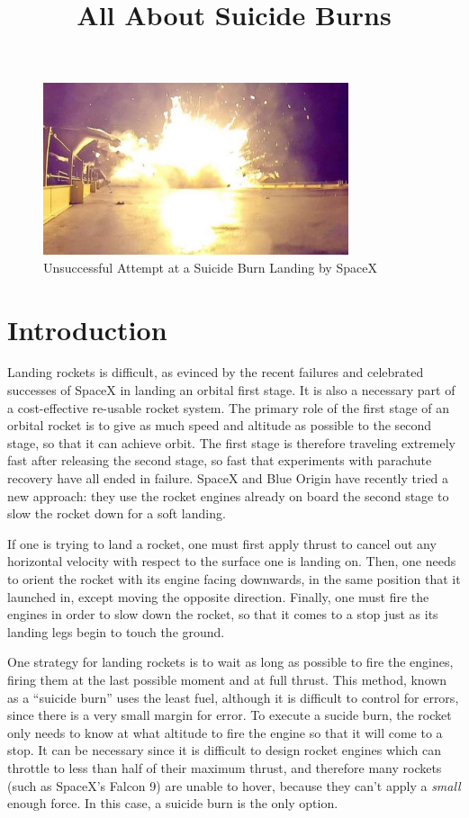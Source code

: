 \documentclass{article}
\begin{document}
\title{All About Suicide Burns}
\maketitle

\begin{figure}[h]
\includegraphics[width=0.8\textwidth]{falcon_9_barge_crash.jpg}
\caption{Unsuccessful Attempt at a Suicide Burn Landing by SpaceX}
\end{figure}

\section{Introduction}

Landing rockets is difficult, as evinced by the recent failures and 
	celebrated successes of SpaceX in landing an orbital first stage.
It is also a necessary part of a cost-effective re-usable rocket system.
The primary role of the first stage of an orbital rocket is to give as much
	speed and altitude as possible to the second stage, so that it can achieve
	orbit.
The first stage is therefore traveling extremely fast after releasing the second stage,
	so fast that experiments with parachute recovery have all ended in failure.
SpaceX and Blue Origin have recently tried a new approach:
	they use the rocket engines already on board the second stage to slow the
	rocket down for a soft landing.

If one is trying to land a rocket, one must first apply thrust to cancel out 
	any horizontal velocity with respect to the surface one is landing on.
Then, one needs to orient the rocket with its engine facing downwards, in the same
	position that it launched in, except moving the opposite direction.
Finally, one must fire the engines in order to slow down the rocket, so that
	it comes to a stop just as its landing legs begin to touch the ground.

One strategy for landing rockets is to wait as long as possible to fire the
	engines, firing them at the last possible moment and at full thrust.
This method, known as a ``suicide burn'' uses the least fuel, although it 
	is difficult to control for errors, since there is a very small margin for error.
To execute a sucide burn, the rocket only needs to know at what altitude to fire the
	engine so that it will come to a stop.
It can be necessary since it is difficult to design rocket engines which
	can throttle to less than half of their maximum thrust, and therefore 
	many rockets (such as SpaceX's
	Falcon 9) are unable to hover, because they can't apply 
	a \emph{small} enough force.
In this case, a suicide burn is the only option.
\end{document}
